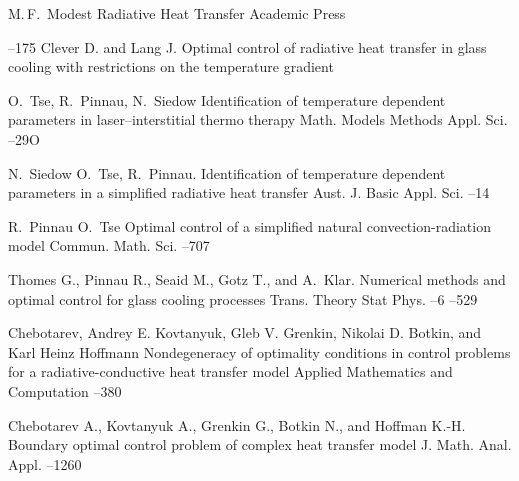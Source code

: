 \documentclass[10pt]{article}
\begin{document}
    \begin{thebibliography}{10}

        \by M.\,F.~Modest
        \book Radiative Heat Transfer
        \publ Academic Press

        --175
        \by Clever D. and Lang J.
        \paper Optimal control of radiative heat transfer in glass cooling with restrictions on the temperature gradient

        \by O.~Tse, R.~Pinnau, N.~Siedow
        \paper Identification of temperature dependent parameters in laser--interstitial thermo therapy
        \jour Math. Models Methods Appl. Sci.
        --29O

        \by N.~Siedow O.~Tse, R.~Pinnau.
        \paper Identification of temperature dependent parameters in a simplified radiative heat transfer
        \jour Aust. J. Basic Appl. Sci.
        --14

        \by R.~Pinnau O.~Tse
        \paper Optimal control of a simplified natural convection-radiation model
        \jour Commun. Math. Sci.
        --707

        \by Thomes G., Pinnau R., Seaid M., Gotz T., and A.~Klar.
        \pages Numerical methods and optimal control for glass cooling processes
        \jour Trans. Theory Stat Phys.
        --6
        –529


         Chebotarev, {Andrey E.} Kovtanyuk, {Gleb V.} Grenkin, {Nikolai D.} Botkin, and {Karl Heinz} Hoffmann
        \paper Nondegeneracy of optimality conditions in control problems for a radiative-conductive heat transfer model
        \jour Applied Mathematics and Computation
        --380

        Chebotarev A., Kovtanyuk A., Grenkin G., Botkin N., and Hoffman K.-H.
        \paper Boundary optimal control problem of complex heat transfer model
        \jour J. Math. Anal. Appl.
        –1260


\end{thebibliography}
\end{document}
